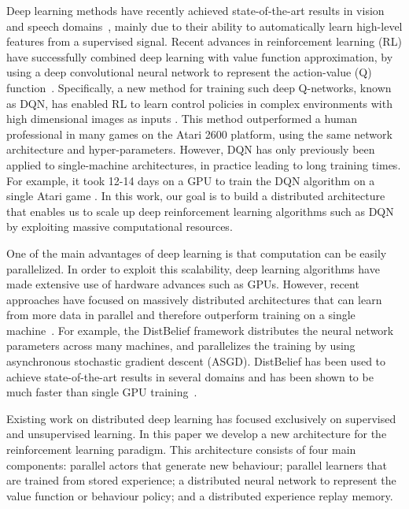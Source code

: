\documentclass{article}
\begin{document}
Deep learning methods have recently achieved state-of-the-art results in vision and speech domains~\cite{krizhevsky-imagenet,simonyan-deep,szegedy-deep,graves2013speech,dahl2012context}, mainly due to their ability to automatically learn high-level features from a supervised signal. Recent advances in reinforcement learning (RL) have successfully combined deep learning with value function approximation, by using a deep convolutional neural network to represent the action-value (Q) function~\cite{mnih2013atari}. Specifically, a new method for training such deep Q-networks, known as DQN, has enabled RL to learn control policies in complex environments with high dimensional images as inputs \cite{mnih-dqn-2015}. This method outperformed a human professional in many games on the Atari 2600 platform, using the same network architecture and hyper-parameters. However, DQN has only previously been applied to single-machine architectures, in practice leading to long training times. For example, it took 12-14 days on a GPU to train the DQN algorithm on a single Atari game \cite{mnih-dqn-2015}. In this work, our goal is to build a distributed architecture that enables us to scale up deep reinforcement learning algorithms such as DQN by exploiting massive computational resources.

One of the main advantages of deep learning is that computation can be easily parallelized. In order to exploit this scalability, deep learning algorithms have made extensive use of hardware advances such as GPUs. However, recent approaches have focused on massively distributed architectures that can learn from more data in parallel and therefore outperform training on a single machine~\cite{coates2013deep,dean2012distbelief}. For example, the DistBelief framework \cite{dean2012distbelief} distributes the neural network parameters across many machines, and parallelizes the training by using  asynchronous stochastic gradient descent (ASGD). DistBelief has been used to achieve state-of-the-art results in several domains \cite{szegedy-deep} and has been shown to be much faster than single GPU training~\cite{dean2012distbelief}.

Existing work on distributed deep learning has focused exclusively on supervised and unsupervised learning. In this paper we develop a new architecture for the reinforcement learning paradigm. This architecture consists of four main components: parallel actors that generate new behaviour; parallel learners that are trained from stored experience; a distributed neural network to represent the value function or behaviour policy; and a distributed experience replay memory. 
\end{document}
